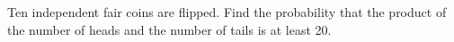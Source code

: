 Ten independent fair coins are flipped. Find the probability that the product of the number of heads and the number of tails is at least 20.
